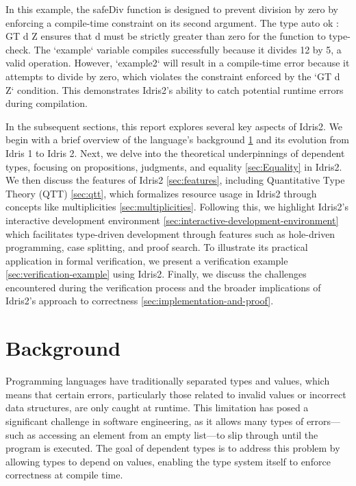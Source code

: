 \documentclass[]{rptuseminar}
\begin{document}
In this example, the safeDiv function is designed to prevent division by zero by enforcing a compile-time constraint on its second argument. The type {auto ok : GT d Z} ensures that d must be strictly greater than zero for the function to type-check. The `example` variable compiles successfully because it divides 12 by 5, a valid operation. However, `example2` will result in a compile-time error because it attempts to divide by zero, which violates the constraint enforced by the `GT d Z` condition. This demonstrates Idris2's ability to catch potential runtime errors during compilation.

In the subsequent sections, this report explores several key aspects of Idris2. We begin with a brief overview of the language's background \ref{sec:background} and its evolution from Idris 1 to Idris 2. Next, we delve into the theoretical underpinnings of dependent types, focusing on propositions, judgments, and equality \ref{sec:Equality} in Idris2. We then discuss the features of Idris2 \ref{sec:features}, including Quantitative Type Theory (QTT) \ref{sec:qtt}, which formalizes resource usage in Idris2 through concepts like multiplicities \ref{sec:multiplicities}. Following this, we highlight Idris2's interactive development environment \ref{sec:interactive-development-environment} which facilitates type-driven development through features such as hole-driven programming, case splitting, and proof search. To illustrate its practical application in formal verification, we present a verification example \ref{sec:verification-example} using Idris2. Finally, we discuss the challenges encountered during the verification process and the broader implications of Idris2’s approach to correctness \ref{sec:implementation-and-proof}.

\section{Background}  
\label{sec:background}  

Programming languages have traditionally separated types and values, which means that certain errors, particularly those related to invalid values or incorrect data structures, are only caught at runtime. This limitation has posed a significant challenge in software engineering, as it allows many types of errors—such as accessing an element from an empty list—to slip through until the program is executed. The goal of dependent types is to address this problem by allowing types to depend on values, enabling the type system itself to enforce correctness at compile time.
\end{document}
